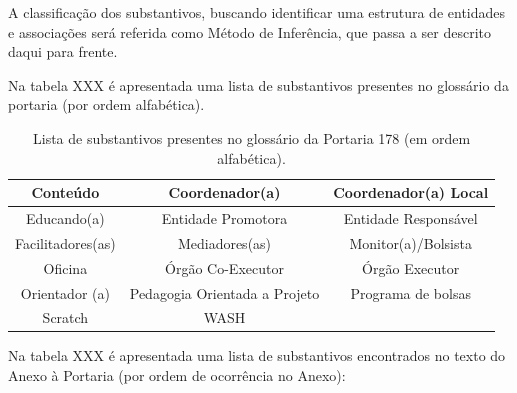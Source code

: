 \documentclass[
12pt,		%
openright,	%
twoside,  %
a4paper,			%
chapter=TITLE,		%
english,			%
french,				%
spanish,			%
brazil				%
]{USPSC-classe/USPSC}
\begin{document}
A classifica\c{c}\~ao dos substantivos, buscando identificar uma estrutura de entidades e associa\c{c}\~oes ser\'a referida como \textquotedbl M\'etodo de Infer\^encia\textquotedbl , que passa a ser descrito daqui para frente.


Na tabela XXX \'e apresentada uma lista de substantivos presentes no gloss\'ario da portaria (por ordem alfab\'etica).






\begin{table}[htb]
\tiny
\caption{\label{851a1e52af25f74c678bf17c26eb1854f2e97387}Lista de substantivos presentes no gloss\'ario da Portaria 178 (em ordem alfab\'etica).}

\centering
\begin{tabular}{|c|c|c|}
\hline
Conte\'udo  &  Coordenador(a)  &  Coordenador(a) Local \\
\hline
Educando(a)  &  Entidade Promotora  &  Entidade Respons\'avel \\
\hline
Facilitadores(as)  &  Mediadores(as)  &  Monitor(a)/Bolsista \\
\hline
Oficina  &  \'Org\~ao Co-Executor  &  \'Org\~ao Executor \\
\hline
Orientador (a)  &  Pedagogia Orientada a Projeto  & Programa de bolsas \\
\hline
Scratch  &  WASH  &  \\
\hline
\end{tabular}
\end{table}


Na tabela XXX \'e apresentada uma lista de substantivos encontrados no texto do Anexo \`a Portaria (por ordem de ocorr\^encia no Anexo):
\end{document}
